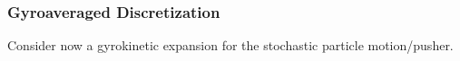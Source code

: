 \subsubsection{Gyroaveraged Discretization}\label{cha:gyroaveraging}
    Consider now a gyrokinetic expansion for the stochastic particle motion/pusher.


    
    
    
